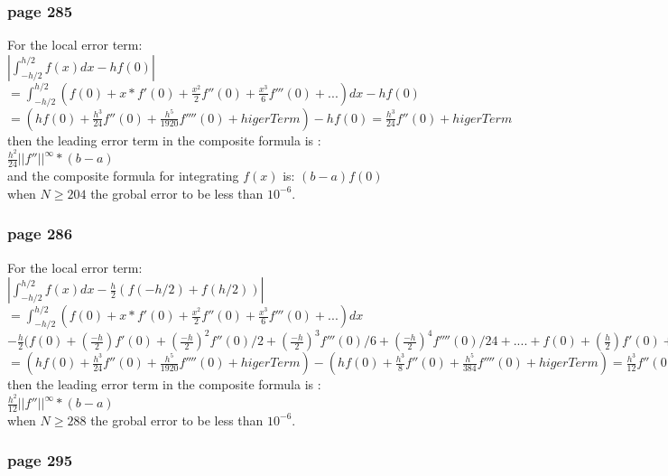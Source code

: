 \documentclass[]{article}
\begin{document}
\subsubsection{page 285}
For the local error term:\\
$|\int_{-h/2}^{h/2}f(x)dx -hf(0)|$\\ 
$=\int_{-h/2}^{h/2}(f(0)+x*f'(0)+\frac{x^2}{2}f''(0)+\frac{x^3}{6}f'''(0)+...)dx-hf(0)$\\
$=(hf(0)+\frac{h^3}{24}f''(0)+\frac{h^5}{1920}f''''(0)+higerTerm)-hf(0) =\frac{h^3}{24}f''(0)+higerTerm$\\
then the leading error term in the composite formula is :\\
$\frac{h^2}{24}||f''||^\infty*(b-a)$\\
and the composite formula for integrating $f(x)$ is:
$(b-a)f(0)$\\
 when $N \geq 204$ the grobal error to be less than $10^{-6}$.
\subsubsection{page 286}
For the local error term:\\
$|\int_{-h/2}^{h/2}f(x)dx -\frac{h}{2}(f(-h/2)+f(h/2))|$\\ $=\int_{-h/2}^{h/2} (f(0)+x*f'(0)+\frac{x^2}{2}f''(0)+\frac{x^3}{6}f'''(0)+...)dx$\\
$-\frac{h}{2}(f(0)+(\frac{-h}{2})f'(0)+(\frac{-h}{2})^2f''(0)/2+(\frac{-h}{2})^3f'''(0)/6+(\frac{-h}{2})^4f''''(0)/24+....+f(0)+(\frac{h}{2})f'(0)+(\frac{h}{2})^2f''(0)/2+(\frac{h}{2})^3f'''(0)/6+(\frac{h}{2})^4f''''(0)/24+......$\\
$=(hf(0)+\frac{h^3}{24}f''(0)+\frac{h^5}{1920}f''''(0)+higerTerm)- (hf(0)+\frac{h^3}{8}f''(0)+\frac{h^5}{384}f''''(0)+higerTerm) =\frac{h^3}{12}f''(0)+higerTerm$\\
then the leading error term in the composite formula is :\\
$\frac{h^2}{12}||f''||^\infty*(b-a)$\\
 when $N \geq 288$ the grobal error to be less than $10^{-6}$.
\subsubsection{page 295} 
\end{document}
